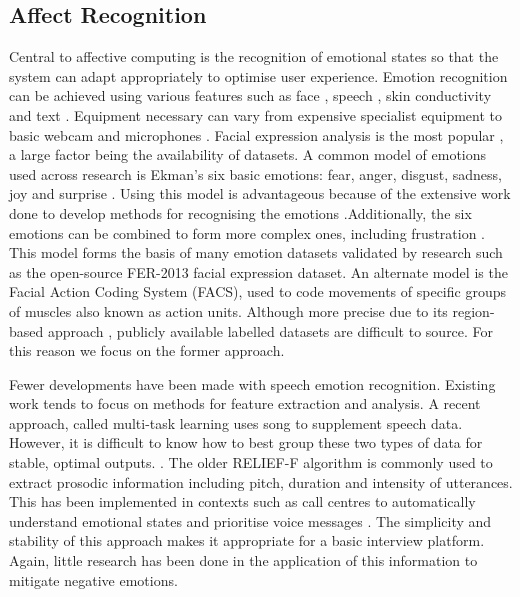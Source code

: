 \documentclass[12pt,a4paper]{article}
\begin{document}
\subsection{Affect Recognition}
Central to affective computing is the recognition of emotional states so that the system can adapt appropriately to optimise user experience. Emotion recognition can be achieved using various features such as face \cite{huber2016recognizing}, speech \cite{petrushin1999emotion}, skin conductivity \cite{woolf2009affect} and text \cite{klein2002computer}. Equipment necessary can vary from expensive specialist equipment \cite{cohen2003evaluation} to basic webcam and microphones \cite{barron2012intelligent}. Facial expression analysis is the most popular \cite{giannopoulos2018deep}, a large factor being the availability of datasets. A common model of emotions used across research is Ekman's six basic emotions: fear, anger, disgust, sadness, joy and surprise \cite{ekman1992argument}. Using this model is advantageous because of the extensive work done to develop methods for recognising the emotions \cite{giannopoulos2018deep}.Additionally, the six emotions can be combined to form more complex ones, including frustration \cite{ekman1992argument}. This model forms the basis of many emotion datasets validated by research such as the open-source FER-2013 facial expression dataset. An alternate model is the Facial Action Coding System (FACS), used to code movements of specific groups of muscles also known as action units. Although more precise due to its region-based approach \cite{ekman2002facial}, publicly available labelled datasets are difficult to source. For this reason we focus on the former approach.


Fewer developments have been made with speech emotion recognition. Existing work tends to focus on methods for feature extraction and analysis. A recent approach, called multi-task learning uses song to supplement speech data. However, it is difficult to know how to best group these two types of data for stable, optimal outputs. \cite{zhang2016cross}. The older RELIEF-F algorithm \cite{kononenko1994estimating} is commonly used to extract prosodic information including pitch, duration and intensity of utterances. This has been implemented in contexts such as call centres to automatically understand emotional states and prioritise voice messages \cite{petrushin1999emotion}. The simplicity and stability of this approach makes it appropriate for a basic interview platform. Again, little research has been done in the application of this information to mitigate negative emotions.
\end{document}
